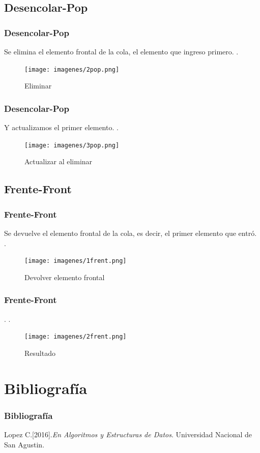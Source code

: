 \documentclass{beamer}
\begin{document}
\subsection{Desencolar-Pop}
    \begin{frame}
      \frametitle{Desencolar-Pop}
      Se elimina el elemento frontal de la cola, el elemento que ingreso primero. 
      .\\
      
      \begin{figure}
	\texttt{[image: imagenes/2pop.png]}
      \caption{Eliminar}
      \end{figure}
      
    \end{frame}
    \begin{frame}
      \frametitle{Desencolar-Pop}
      Y actualizamos el primer elemento.
      .\\
      \begin{figure}
	\texttt{[image: imagenes/3pop.png]}
	\caption{Actualizar al eliminar}
      \end{figure}
    \end{frame}
    
\subsection{Frente-Front}
    \begin{frame}
      \frametitle{Frente-Front}
      Se devuelve el elemento frontal de la cola, es decir, el primer elemento que entró.\\ 
      .\\
      
      \begin{figure}
	\texttt{[image: imagenes/1frent.png]}
     \caption{Devolver elemento frontal}
     \end{figure}
      
    \end{frame}
    \begin{frame}
      \frametitle{Frente-Front}
.
      .\\
      \begin{figure}
	\texttt{[image: imagenes/2frent.png]}
    \caption{Resultado}
    \end{figure}
    
    \end{frame}



\section{Bibliografía}
\begin{frame}
\frametitle{Bibliografía}
\begin{thebibliography}{99}

 Lopez C.[2016].\emph{En Algoritmos y Estructuras de Datos}. Universidad Nacional de San Agustin.

\end{thebibliography}
\end{frame}
\end{document}
